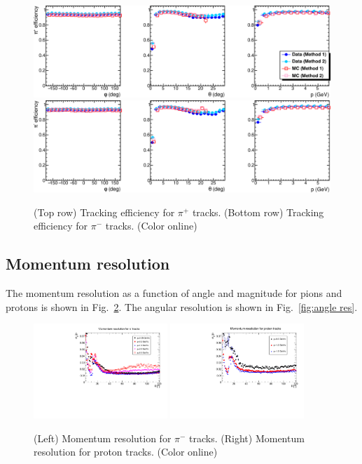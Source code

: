 \begin{figure}[tpb]
\begin{center}
\includegraphics[width=\textwidth]{figures/PiPlusEfficiency.pdf}
\includegraphics[width=\textwidth]{figures/PiMinusEfficiency.pdf}
\caption{\label{fig:tracking efficiency}
(Top row) Tracking efficiency for $\pi^+$ tracks. (Bottom row) Tracking efficiency for $\pi^-$ tracks.  (Color online)}
\end{center}
\end{figure}




\subsection{Momentum resolution}

The momentum resolution as a function of angle and magnitude for pions and 
protons is shown in Fig.~\ref{fig:dp_p}.  The angular resolution is shown in 
Fig.~\ref{fig:angle res}.


\begin{figure}[tbp]
\begin{center}
\includegraphics[width=0.45\textwidth]{figures/PionMomentumResolution.pdf}
\includegraphics[width=0.45\textwidth]{figures/ProtonMomentumResolution.pdf}
\caption{\label{fig:dp_p} (Left) Momentum resolution for $\pi^-$ tracks.
(Right) Momentum resolution for proton tracks. (Color online)}
\end{center}
\end{figure}

